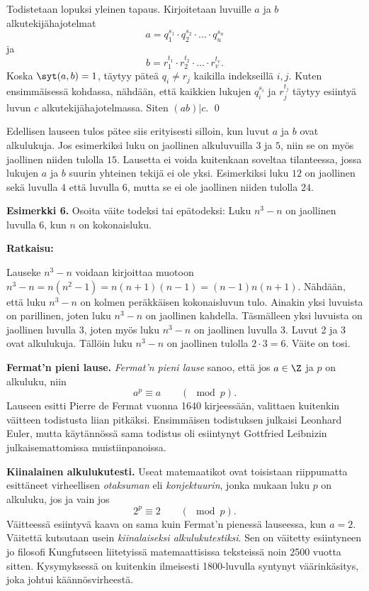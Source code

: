 Todistetaan lopuksi yleinen tapaus. Kirjoitetaan luvuille $a$ ja $b$ alkutekijähajotelmat
\[
a=q_1^{s_1} \cdot q_2^{s_2} \cdot \ldots \cdot q_u^{s_u}
\]
ja
\[
b=r_1^{t_1} \cdot r_2^{t_2} \cdot \ldots \cdot r_v^{t_v}.
\]
Koska $\syt(a,b)=1$, täytyy päteä $q_i\neq r_j$ kaikilla indekseillä $i,j$. Kuten ensimmäisessä kohdassa, nähdään, että kaikkien lukujen $q_i^{s_i}$ ja $r_j^{t_j}$ täytyy esiintyä luvun $c$ alkutekijähajotelmassa. Siten $(ab)|c$.
\qed

Edellisen lauseen tulos pätee siis erityisesti silloin, kun luvut $a$ ja $b$ ovat alkulukuja. Jos esimerkiksi luku on jaollinen alkuluvuilla $3$ ja $5$, niin se on myös jaollinen niiden tulolla $15$. Lausetta ei voida kuitenkaan soveltaa tilanteessa, jossa lukujen $a$ ja $b$ suurin yhteinen tekijä ei ole yksi. Esimerkiksi luku $12$ on jaollinen sekä luvulla $4$ että luvulla $6$, mutta se ei ole jaollinen niiden tulolla $24$.

{\bf Esimerkki 6.}
Osoita väite todeksi tai epätodeksi: Luku $n^3 - n$ on jaollinen luvulla $6$, kun $n$ on
kokonaisluku.


{\bf Ratkaisu:}

Lauseke $n^3 - n$ voidaan kirjoittaa muotoon $n^3 - n = n(n^2
- 1) = n(n + 1)(n - 1) = (n - 1)n(n + 1)$. Nähdään, että luku
$n^3 - n$ on kolmen peräkkäisen kokonaisluvun tulo. Ainakin
yksi luvuista on parillinen, joten luku $n^3 - n$ on jaollinen
kahdella. Täsmälleen yksi luvuista on jaollinen luvulla $3$,
joten myös luku $n^3 - n$ on jaollinen luvulla $3$. Luvut 2 ja
3 ovat alkulukuja. Tällöin luku $n^3 - n$ on jaollinen tulolla
$2 \cdot 3 = 6$. Väite on tosi.

{\bf Fermat'n pieni lause.} {\em Fermat'n pieni lause} sanoo, että jos $a\in\Z$ ja $p$ on alkuluku, niin 
\[
a^p \equiv a \qquad (\mod p).
\]
Lauseen esitti Pierre de Fermat vuonna 1640 kirjeessään, valittaen kuitenkin väitteen todistusta liian pitkäksi. Ensimmäisen todistuksen julkaisi Leonhard Euler, mutta käytännössä sama todistus oli esiintynyt Gottfried Leibnizin julkaisemattomissa muistiinpanoissa.

{\bf Kiinalainen alkulukutesti.}
Useat matemaatikot ovat toisistaan riippumatta esittäneet virheellisen {\em otaksuman} eli {\em konjektuurin}, jonka mukaan luku $p$ on alkuluku, jos ja vain jos
\[
2^p \equiv 2 \qquad (\mod p).
\]
Väitteessä esiintyvä kaava on sama kuin Fermat'n pienessä lauseessa, kun $a=2$. Väitettä kutsutaan usein {\em kiinalaiseksi alkulukutestiksi}. Sen on väitetty esiintyneen jo filosofi Kungfutseen liitetyissä matemaattisissa teksteissä noin 2500 vuotta sitten. Kysymyksessä on kuitenkin ilmeisesti 1800-luvulla syntynyt väärinkäsitys, joka johtui  kään\-nös\-vir\-hees\-tä.

